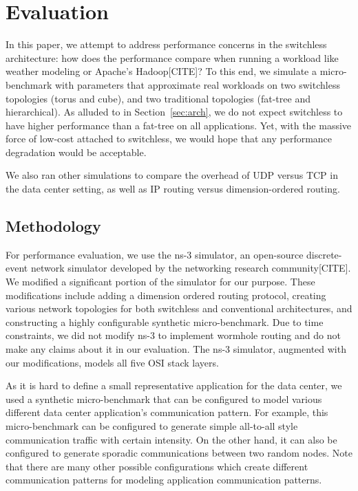 \section{Evaluation}
\label{sec:eval}
In this paper, we attempt to address performance concerns in the switchless architecture: how does the performance compare when running a workload like weather modeling or Apache's Hadoop[CITE]? To this end, we simulate a micro-benchmark with parameters that approximate real workloads on two switchless topologies (torus and cube), and two traditional topologies (fat-tree and hierarchical). As alluded to in Section~\ref{sec:arch}, we do not expect switchless to have higher performance than a fat-tree on all applications. Yet, with the massive force of low-cost attached to switchless, we would hope that any performance degradation would be acceptable.

We also ran other simulations to compare the overhead of UDP versus TCP in the data center setting, as well as IP routing versus dimension-ordered routing.

\subsection {Methodology}
For performance evaluation, we use the ns-3 simulator\cite{Ns3:Online}, an open-source discrete-event network simulator developed by the networking research community[CITE]. We modified a significant portion of the simulator for our purpose. These modifications include adding a dimension ordered routing protocol, creating various network topologies for both switchless and conventional architectures, and constructing a highly configurable synthetic micro-benchmark.  Due to time constraints, we did not modify ns-3 to implement wormhole routing and do not make any claims about it in our evaluation.  The ns-3 simulator, augmented with our modifications, models all five OSI stack layers.

As it is hard to define a small representative application for the data center, we used a synthetic micro-benchmark that can be configured to model various different data center application's communication pattern. For example, this micro-benchmark can be configured to generate simple all-to-all style communication traffic with certain intensity. On the other hand, it can also be configured to generate sporadic communications between two random nodes. Note that there are many other possible configurations which create different communication patterns for modeling application communication patterns.

